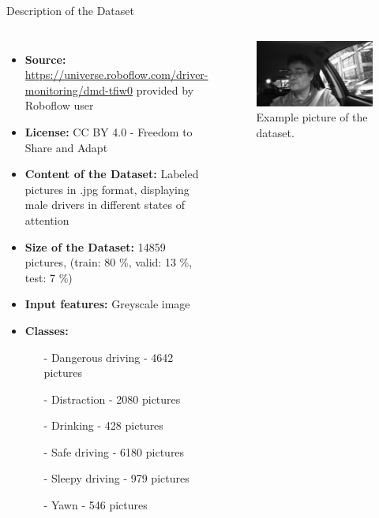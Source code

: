 \begin{frame}{\huge{Description of the Dataset}}
  \begin{columns}
      \begin{itemize}
        \item \textbf{Source:} \url{https://universe.roboflow.com/driver-monitoring/dmd-tfiw0} provided by Roboflow user
        \item \textbf{License:} CC BY 4.0 - Freedom to Share and Adapt
        \item \textbf{Content of the Dataset:} Labeled pictures in .jpg format, displaying male drivers in different states of attention
        \item \textbf{Size of the Dataset:} 14859 pictures, (train: 80 \%, valid: 13 \%, test: 7 \%)
        \item \textbf{Input features:} Greyscale image
        \item \textbf{Classes:}
        \begin{itemize}
          \item[-] Dangerous driving - 4642 pictures
          \item[-] Distraction - 2080 pictures
          \item[-] Drinking - 428 pictures
          \item[-] Safe driving - 6180 pictures
          \item[-] Sleepy driving - 979 pictures
          \item[-] Yawn - 546 pictures
        \end{itemize}
      \end{itemize}
      \begin{figure}
        \centering
        \includegraphics[width=\textwidth]{content/gA_1_s1_ir_face_mp4-26_jpg.rf.8073bccb5c613d34b8f058da71adc5d8.jpg}
        \caption{Example picture of the dataset.}
      \end{figure}
  \end{columns}
\end{frame}


